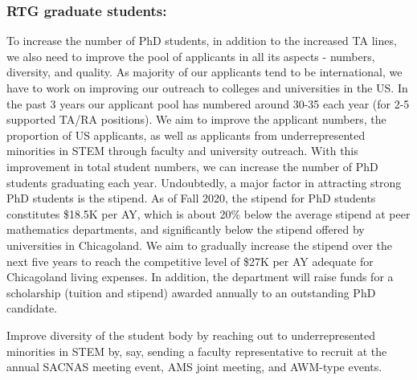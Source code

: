 \documentclass[11pt]{NSFamsart}
\begin{document}
  \subsubsection*{RTG graduate students:} 
To increase the number of PhD students, in addition to the increased TA lines, we also need to improve the pool of applicants in all its aspects - numbers, diversity, and quality. As majority of our applicants tend to be international, we have to work on improving our outreach to colleges and universities in the US. In the past 3 years our applicant pool has numbered around 30-35 each year (for 2-5 supported TA/RA positions). We aim to improve the applicant numbers, the proportion of US applicants, as well as applicants from underrepresented minorities in STEM through faculty and university outreach. With this improvement in total student numbers, we can increase the number of PhD students graduating each year.
Undoubtedly, a major factor in attracting strong PhD students is the stipend. As of Fall 2020, the stipend for PhD students constitutes \$18.5K per AY, which is about 20\% below the average stipend at peer mathematics departments, and significantly below the stipend offered by universities in Chicagoland. We aim to gradually increase the stipend over the next five years to reach the competitive level of \$27K per AY adequate for Chicagoland living expenses. In addition, the department will raise funds for a scholarship (tuition and stipend) awarded annually to an outstanding PhD candidate.

Improve diversity of the student body by reaching out to underrepresented minorities in STEM by, say, sending a faculty representative to recruit at the annual SACNAS meeting event, AMS joint meeting, and AWM-type events.

 
\end{document}
